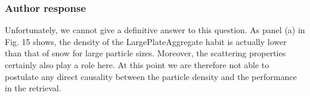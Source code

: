 \documentclass[11pt]{scrartcl}
\begin{document}
\subsubsection{Author response}

Unfortunately, we cannot give a definitive answer to this question. As panel (a)
in Fig. 15 shows, the density of the LargePlateAggregate habit is actually lower
than that of snow for large particle sizes. Moreover, the scattering properties
certainly also play a role here. At this point we are therefore not able to
postulate any direct causality between the particle density and the performance
in the retrieval.



\end{document}
